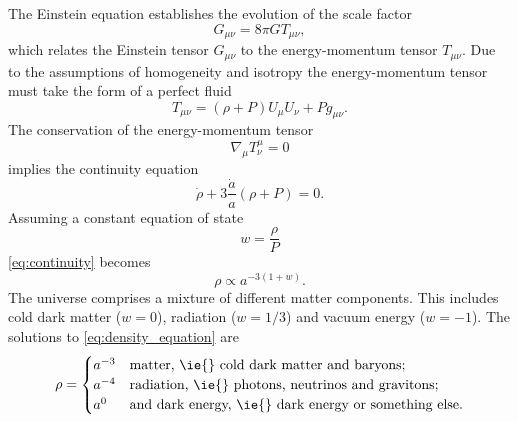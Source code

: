 The Einstein equation establishes the evolution of the scale factor
%
\begin{equation}\label{eq:einstein_tensor}
	G_{\mu\nu}
    = 8\pi G T_{\mu\nu},
\end{equation}
%
which relates the Einstein tensor \(G_{\mu\nu}\) to the energy-momentum tensor \(T_{\mu\nu}\).
Due to the assumptions of homogeneity and isotropy the energy-momentum tensor must take the form of a perfect fluid
%
\begin{equation}\label{eq:energy_momentum}
	T_{\mu\nu}
    = (\rho + P) U_{\mu} U_{\nu} + P g_{\mu\nu}.
\end{equation}
%
The conservation of the energy-momentum tensor
%
\begin{equation}
	\nabla_{\mu} T^{\mu}_{\nu}
    = 0
\end{equation}
%
implies the continuity equation
%
\begin{equation}\label{eq:continuity}
	\dot{\rho} + 3\frac{\dot{a}}{a}(\rho + P)
    = 0.
\end{equation}
%
Assuming a constant equation of state
%
\begin{equation}
	w
    = \frac{\rho}{P}
\end{equation}
%
\cref{eq:continuity} becomes
%
\begin{equation}\label{eq:density_equation}
	\rho \propto a^{-3(1+w)}.
\end{equation}
%
The universe comprises a mixture of different matter components.
This includes cold dark matter (\(w=0\)), radiation (\(w=1/3\)) and vacuum energy (\(w=-1\)).
The solutions to \cref{eq:density_equation} are
%
\begin{equation}
	\rho =
	\begin{cases}
		a^{-3} & \text{matter, \ie{} cold dark matter and baryons};        \\
		a^{-4} & \text{radiation, \ie{} photons, neutrinos and gravitons}; \\
		a^{0}  & \text{and dark energy, \ie{} dark energy or something else}.
	\end{cases}
\end{equation}

